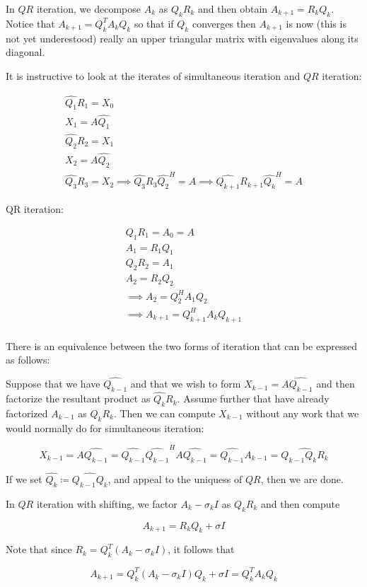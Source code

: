 \documentclass[../main.tex]{subfiles}
\begin{document}
\begin{definition}
    In $QR$ iteration, we decompose $A_k$ as $Q_kR_k$ and then obtain $A_{k+1} = R_kQ_k$. Notice that $A_{k+1} = Q_{k}^TA_kQ_k$ so that if $Q_k$ converges then $A_{k+1}$ is now (this is not yet underestood) really an upper triangular matrix with eigenvalues along its diagonal.
\end{definition}

\begin{remark}
    It is instructive to look at the iterates of simultaneous iteration and $QR$ iteration:

    \begin{align*}
        \hat{Q_1}R_1 = X_0 \\
        X_1 = A \hat{Q_1} \\
        \hat{Q_2}R_2 = X_1 \\
        X_2 = A \hat{Q_2} \\
        \hat{Q_3}R_3 = X_2
        \implies \hat{Q_3} R_3 \hat{Q_2}^H = A
        \implies \hat{Q_{k+1}} R_{k+1} \hat{Q_k}^H = A
    \end{align*}

    QR iteration:

    \begin{align*}
        Q_1R_1 = A_0 = A \\
        A_1 = R_1Q_1 \\
        Q_2R_2 = A_1\\
        A_2 = R_2Q_2 \\
        \implies A_2 = Q_2^H A_1 Q_2 \\
        \implies A_{k+1} = Q_{k+1}^H A_k Q_{k+1} \\
    \end{align*}

    There is an equivalence between the two forms of iteration that can be expressed as follows:

    Suppose that we have $\hat{Q_{k-1}}$ and that we wish to form $X_{k-1} = A \hat{Q_{k-1}}$ and then factorize the resultant product as $\hat{Q_k}R_k$. Assume further that have already factorized $A_{k-1}$ as $Q_k R_k$. Then we can compute $X_{k-1}$ without any work that we would normally do for simultaneous iteration:

    \[
        X_{k-1} = A \hat{Q_{k-1}} = \hat{Q_{k-1}}\hat{Q_{k-1}}^H A \hat{Q_{k-1}} = \hat{Q_{k-1}}A_{k-1} = \hat{Q_{k-1}Q_k R_k}
    \]

    If we set $\hat{Q_k} \coloneq \hat{Q_{k-1}Q_k}$, and appeal to the uniquess of $QR$, then we are done.

\end{remark}
\begin{definition}
    In $QR$ iteration with shifting, we factor $A_k - \sigma_k I$ as $Q_k R_k$ and then compute

    \[
        A_{k+1} = R_k Q_k + \sigma I
    \]

    Note that since $R_k = Q_k^T(A_k - \sigma_k I)$, it follows that

    \[
        A_{k+1} = Q_k^T(A_k - \sigma_k I)Q_k + \sigma I = Q_k^T A_k Q_k
    \]
\end{definition}
\end{document}
